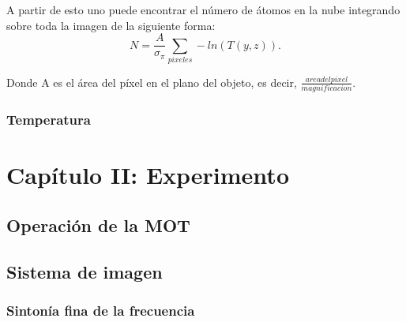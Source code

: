 \documentclass[12pt,twoside]{article}
\begin{document}
A partir de esto uno puede encontrar el número de átomos en la nube integrando sobre toda la imagen de la siguiente forma:
\begin{equation}
%
    N = \frac{A}{\sigma_\pi} \sum_{pixeles} -ln(T(y,z)).
%    
\end{equation}

Donde A es el área del píxel en el plano del objeto, es decir, $\frac{area del pixel}{magnificacion}$.

\subsubsection{Temperatura}\label{teotemp}


\section{Capítulo II: Experimento}\label{experimento}

\subsection{Operación de la MOT}\label{operacion}



\subsection{Sistema de imagen}\label{Sisimag}

\subsubsection{Sintonía fina de la frecuencia}\label{Sintonia}
\end{document}

